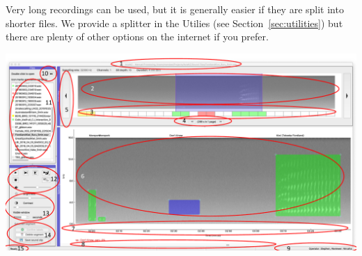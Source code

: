 \documentclass{article}
\begin{document}
Very long recordings can be used, but it is generally easier if they are split into shorter files. We provide a splitter in the Utilies (see Section~\ref{sec:utilities}) but there are plenty of other options on the internet if you prefer.

\begin{center}
\includegraphics[width=.95\textwidth]{Figures/AviaNZInterface.pdf}
\end{center}
\end{document}
